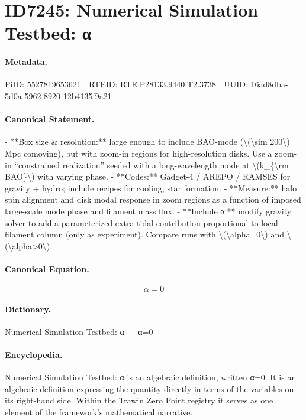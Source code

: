\section*{ID7245: Numerical Simulation Testbed: α}
\paragraph{Metadata.}
PiID: 5527819653621 | RTEID: RTE:P28133.9440:T2.3738 | UUID: 16ad8dba-5d0a-5962-8920-12b4135f9a21

\paragraph{Canonical Statement.}
- **Box size \& resolution:** large enough to include BAO-mode (\textbackslash{}(\textbackslash{}sim 200\textbackslash{}) Mpc comoving), but with zoom-in regions for high-resolution disks. Use a zoom-in “constrained realization” seeded with a long-wavelength mode at \textbackslash{}(k\_\{\textbackslash{}rm BAO\}\textbackslash{}) with varying phase. - **Codes:** Gadget-4 / AREPO / RAMSES for gravity + hydro; include recipes for cooling, star formation. - **Measure:** halo spin alignment and disk modal response in zoom regions as a function of imposed large-scale mode phase and filament mass flux. - **Include α:** modify gravity solver to add a parameterized extra tidal contribution proportional to local filament column (only as experiment). Compare runs with \textbackslash{}(\textbackslash{}alpha=0\textbackslash{}) and \textbackslash{}(\textbackslash{}alpha>0\textbackslash{}).

\paragraph{Canonical Equation.}
\[
\alpha=0
\]

\paragraph{Dictionary.}
Numerical Simulation Testbed: α — α=0

\paragraph{Encyclopedia.}
Numerical Simulation Testbed: α is an algebraic definition, written α=0. It is an algebraic definition expressing the quantity directly in terms of the variables on its right-hand side. Within the Trawin Zero Point registry it serves as one element of the framework's mathematical narrative.
